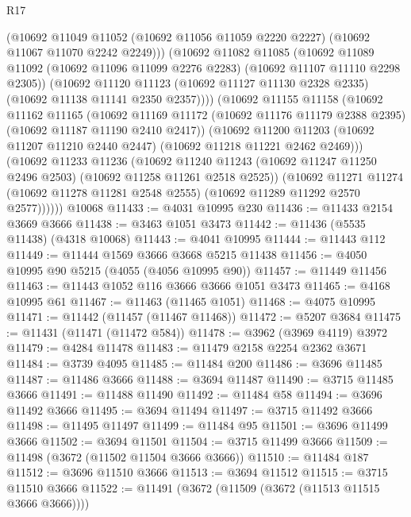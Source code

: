 \begin{lexlean}{R17}
\begin{coremodule}
            (@10692
              @11049
              @11052
              (@10692 @11056 @11059 @2220 @2227)
              (@10692 @11067 @11070 @2242 @2249)))
          (@10692
            @11082
            @11085
            (@10692
              @11089
              @11092
              (@10692 @11096 @11099 @2276 @2283)
              (@10692 @11107 @11110 @2298 @2305))
            (@10692
              @11120
              @11123
              (@10692 @11127 @11130 @2328 @2335)
              (@10692 @11138 @11141 @2350 @2357))))
        (@10692
          @11155
          @11158
          (@10692
            @11162
            @11165
            (@10692
              @11169
              @11172
              (@10692 @11176 @11179 @2388 @2395)
              (@10692 @11187 @11190 @2410 @2417))
            (@10692
              @11200
              @11203
              (@10692 @11207 @11210 @2440 @2447)
              (@10692 @11218 @11221 @2462 @2469)))
          (@10692
            @11233
            @11236
            (@10692
              @11240
              @11243
              (@10692 @11247 @11250 @2496 @2503)
              (@10692 @11258 @11261 @2518 @2525))
            (@10692
              @11271
              @11274
              (@10692 @11278 @11281 @2548 @2555)
              (@10692 @11289 @11292 @2570 @2577))))))
    @10068
@11433 := @4031 @10995 @230
@11436 := @11433 @2154 @3669 @3666
@11438 := @3463 @1051 @3473
@11442 := @11436 (@5535 @11438) (@4318 @10068)
@11443 := @4041 @10995
@11444 := @11443 @112
@11449 := @11444 @1569 @3666 @3668 @5215 @11438
@11456 := @4050 @10995 @90 @5215 (@4055 (@4056 @10995 @90))
@11457 := @11449 @11456
@11463 := @11443 @1052 @116 @3666 @3666 @1051 @3473
@11465 := @4168 @10995 @61
@11467 := @11463 (@11465 @1051)
@11468 := @4075 @10995
@11471 := @11442 (@11457 (@11467 @11468))
@11472 := @5207 @3684
@11475 := @11431 (@11471 (@11472 @584))
@11478 := @3962 (@3969 @4119) @3972
@11479 := @4284 @11478
@11483 := @11479 @2158 @2254 @2362 @3671
@11484 := @3739 @4095
@11485 := @11484 @200
@11486 := @3696 @11485
@11487 := @11486 @3666
@11488 := @3694 @11487
@11490 := @3715 @11485 @3666
@11491 := @11488 @11490
@11492 := @11484 @58
@11494 := @3696 @11492 @3666
@11495 := @3694 @11494
@11497 := @3715 @11492 @3666
@11498 := @11495 @11497
@11499 := @11484 @95
@11501 := @3696 @11499 @3666
@11502 := @3694 @11501
@11504 := @3715 @11499 @3666
@11509 := @11498 (@3672 (@11502 @11504 @3666 @3666))
@11510 := @11484 @187
@11512 := @3696 @11510 @3666
@11513 := @3694 @11512
@11515 := @3715 @11510 @3666
@11522 := @11491 (@3672 (@11509 (@3672 (@11513 @11515 @3666 @3666))))

\end{coremodule}
\end{lexlean}
